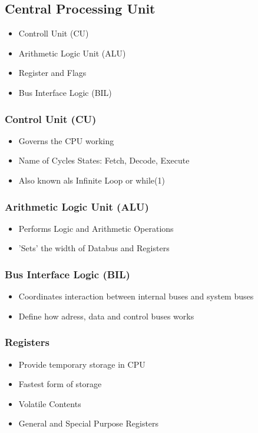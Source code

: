 \subsection{Central Processing Unit }
\begin{multicols}{2}
\begin{minipage}{\linewidth}
	\begin{itemize}
		\item Controll Unit (\acs{CU})
		\item Arithmetic Logic Unit (\acs{ALU})
		\item Register and Flags
		\item Bus Interface Logic (\acs{BIL})
	\end{itemize}
\end{minipage}
	\subsubsection{Control Unit (\acs{CU})}   
		\begin{itemize}
			\item Governs the CPU working
			\item Name of Cycles States: Fetch, Decode, Execute
			\item Also known als Infinite Loop or while(1)
		\end{itemize}	
	\subsubsection{Arithmetic Logic Unit (\acs{ALU})}
	\begin{itemize}
		\item Performs Logic and Arithmetic Operations
		\item 'Sets' the width of Databus and Registers
	\end{itemize}	
	\subsubsection{Bus Interface Logic (\acs{BIL})}
	\begin{itemize}
		\item Coordinates interaction between internal buses and system buses
		\item Define how adress, data and control buses works
	\end{itemize}	
	\subsubsection{Registers}
	\begin{itemize}
		\item Provide temporary storage in \acs{CPU}
		\item Fastest form of storage
		\item Volatile Contents
		\item General and Special Purpose Registers
	\end{itemize}

\end{multicols}

